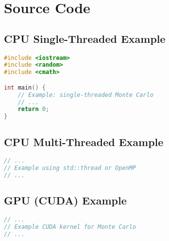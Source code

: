 \documentclass[12pt]{article}
\begin{document}
\appendix
\section{Source Code}
\label{sec:source-code}
\subsection{CPU Single-Threaded Example}
\begin{lstlisting}[language=C++]
#include <iostream>
#include <random>
#include <cmath>

int main() {
    // Example: single-threaded Monte Carlo
    // ...
    return 0;
}
\end{lstlisting}

\subsection{CPU Multi-Threaded Example}
\begin{lstlisting}[language=C++]
// ...
// Example using std::thread or OpenMP
// ...
\end{lstlisting}

\subsection{GPU (CUDA) Example}
\begin{lstlisting}[language=C]
// ...
// Example CUDA kernel for Monte Carlo
// ...
\end{lstlisting}
\end{document}
